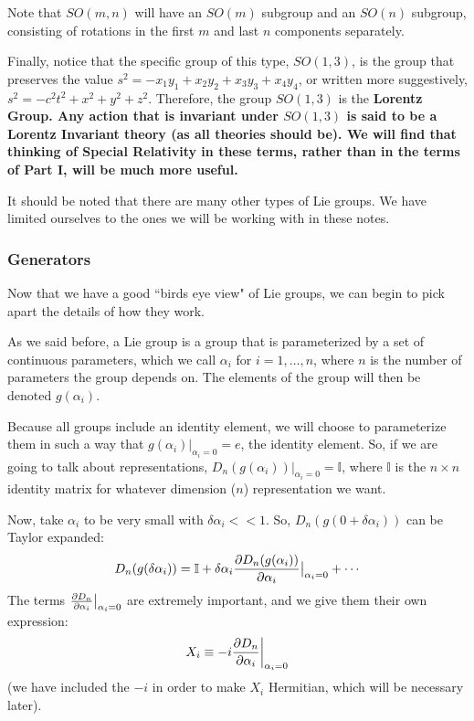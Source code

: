 \documentclass[12pt,epsf]{article}
\def\nolabel{\nonumber }
\def\nolabel{\nonumber }
\begin{document}
Note that $SO(m,n)$ will have an $SO(m)$ subgroup and an $SO(n)$
subgroup, consisting of rotations in the first $m$ and last $n$
components separately.	

Finally, notice that the specific group of this type, $SO(1,3)$, is the
group that preserves the value $s^2 = -x_1y_1+x_2y_2+x_3y_3+x_4y_4$,
or written more suggestively, $s^2 = -c^2t^2 + x^2+y^2+z^2$. 
Therefore, the group $SO(1,3)$ is the \bf Lorentz Group\rm.  Any action
that is invariant under $SO(1,3)$ is said to be a Lorentz Invariant
theory (as all theories should be).  We will find that thinking of
Special Relativity in these terms, rather than in the terms of Part I,
will be much more useful.  

It should be noted that there are many other types of Lie groups.  We
have limited ourselves to the ones we will be working with in these
notes.	

\subsubsection{Generators}
\label{sec:generatorssection}

Now that we have a good ``birds eye view" of Lie groups, we can begin
to pick apart the details of how they work.  

As we said before, a Lie group is a group that is parameterized by a
set of continuous parameters, which we call $\alpha_i$ for
$i=1,\ldots,n$, where $n$ is the number of parameters the group depends
on.  The elements of the group will then be denoted $g(\alpha_i)$.  

Because all groups include an identity element, we will choose to
parameterize them in such a way that $g(\alpha_i)\big|_{\alpha_i=0}=e$, the
identity element.  So, if we are going to talk about representations,
$D_n(g(\alpha_i))\big|_{\alpha_i = 0} = \mathbb{I}$, where $\mathbb{I}$
is the $n\times n$ identity matrix for whatever dimension ($n$)
representation we want.  

Now, take $\alpha_i$ to be very small with $\delta \alpha_i <<1$.  So,
$D_n(g(0+\delta \alpha_i))$ can be Taylor expanded:
\begin{eqnarray}
D_n(g(\delta \alpha_i)) = \mathbb{I}+\delta \alpha_i {\partial
D_n(g(\alpha_i)) \over \partial \alpha_i} \big|_{\alpha_i = 0} + \cdots
\nolabel 
\end{eqnarray}
The terms ${\partial D_n \over \partial \alpha_i} \big|_{\alpha_i = 0}$
are extremely important, and we give them their own expression:
\begin{eqnarray}
X_i \equiv -i {\partial D_n \over \partial \alpha_i} \bigg|_{\alpha_i
=0} \label{eq:generators}
\end{eqnarray}
(we have included the $-i$ in order to make $X_i$ Hermitian, which will
be necessary later).  
\end{document}
